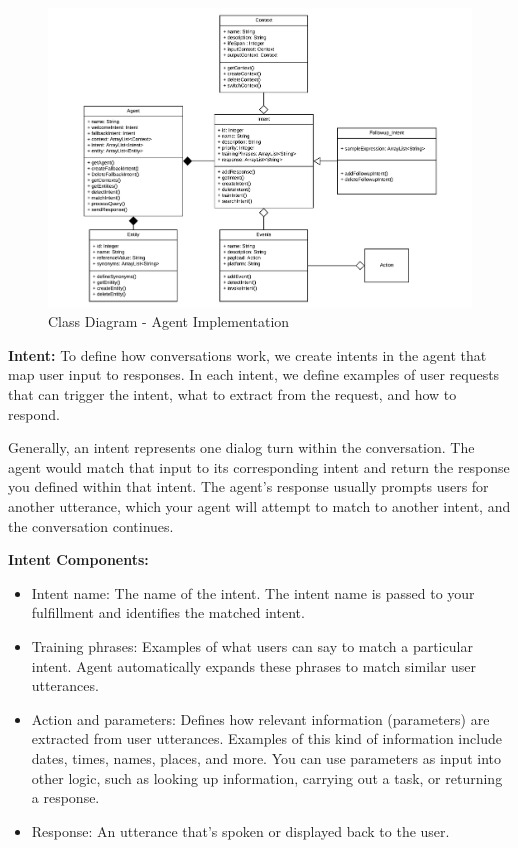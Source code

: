 \documentclass{scrreprt}
\begin{document}
\clearpage
\begin{figure}[ht!]
    \centering
    \includegraphics[angle=90, height=.94\textheight]{img2/ClassDiagramAgent.pdf}
    \caption{Class Diagram - Agent Implementation}
    \label{fig:classdiagramagent}
\end{figure}


\clearpage

\textbf{Intent:} To define how conversations work, we create intents in the agent that map user input to responses. In each intent, we define examples of user requests that can trigger the intent, what to extract from the request, and how to respond.

Generally, an intent represents one dialog turn within the conversation. The agent would match that input to its corresponding intent and return the response you defined within that intent. The agent's response usually prompts users for another utterance, which your agent will attempt to match to another intent, and the conversation continues.



\textbf{Intent Components:} 

\begin{itemize}
    \item Intent name: The name of the intent. The intent name is passed to your fulfillment and identifies the matched intent.

    \item Training phrases: Examples of what users can say to match a particular intent. Agent automatically expands these phrases to match similar user utterances.

    \item Action and parameters: Defines how relevant information (parameters) are extracted from user utterances. Examples of this kind of information include dates, times, names, places, and more. You can use parameters as input into other logic, such as looking up information, carrying out a task, or returning a response.

    \item Response: An utterance that's spoken or displayed back to the user.
\end{itemize}
\end{document}
